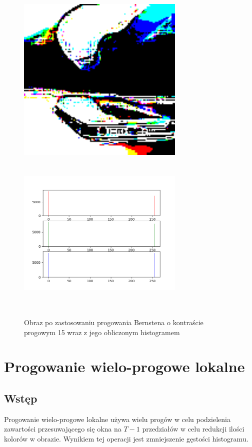\documentclass[a4paper,12pt]{book}
\begin{document}
\begin{figure}[H]	
	\caption{Obraz po zastosowaniu progowania Bernstena o kontraście progowym 15 wraz z jego obliczonym histogramem}
	\includegraphics[width=8cm, height=8cm]{6-4/single-local-threshold-image-phone-15.png}
	\includegraphics[width=8cm, height=8cm]{6-4/single-local-threshold-phone.png}
\end{figure}

\section{Progowanie wielo-progowe lokalne}
\subsection*{Wstęp}
Progowanie wielo-progowe lokalne używa wielu progów w celu podzielenia zawartości przesuwającego się okna na $T-1$ przedziałów w celu redukcji ilości kolorów w obrazie. Wynikiem tej operacji jest zmniejszenie gęstości histogramu. 
\end{document}
